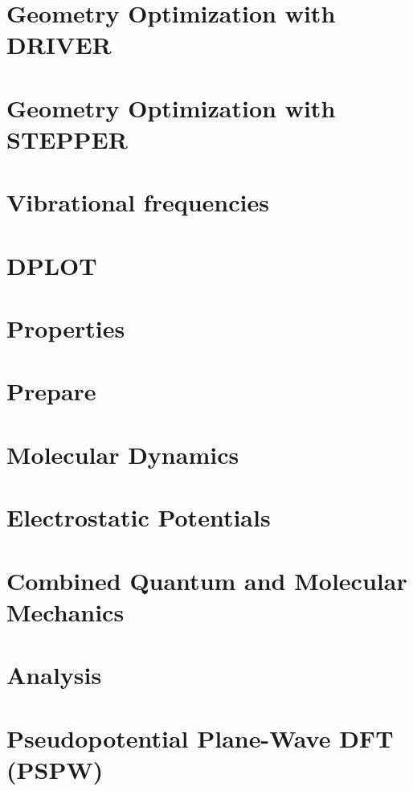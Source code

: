 \chapter{Geometry Optimization with DRIVER}


\chapter{Geometry Optimization with STEPPER}


\chapter{Vibrational frequencies}


\chapter{DPLOT}


\chapter{Properties}


\chapter{Prepare}


\chapter{Molecular Dynamics}


\chapter{Electrostatic Potentials}


\chapter{Combined Quantum and Molecular Mechanics}


\chapter{Analysis}



\chapter{Pseudopotential Plane-Wave DFT (PSPW)}


